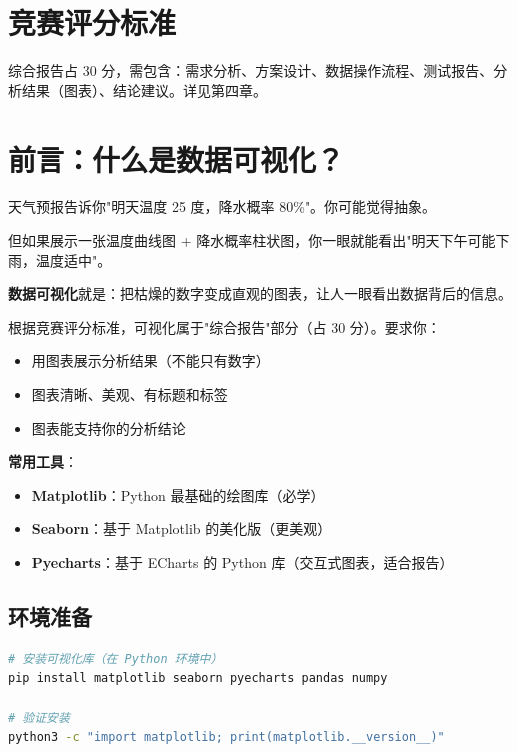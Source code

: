 \documentclass[12pt,a4paper]{article}
\begin{document}
\section*{竞赛评分标准}

综合报告占 30 分，需包含：需求分析、方案设计、数据操作流程、测试报告、分析结果（图表）、结论建议。详见第四章。


\tableofcontents
\newpage

\section{前言：什么是数据可视化？}

\begin{theorybox}[用天气预报理解数据可视化]
天气预报告诉你"明天温度 25 度，降水概率 80\%"。你可能觉得抽象。

但如果展示一张温度曲线图 + 降水概率柱状图，你一眼就能看出"明天下午可能下雨，温度适中"。

\textbf{数据可视化}就是：把枯燥的数字变成直观的图表，让人一眼看出数据背后的信息。
\end{theorybox}

\begin{knowledgebox}[竞赛中的可视化考什么？]
根据竞赛评分标准，可视化属于"综合报告"部分（占 30 分）。要求你：
\begin{itemize}
    \item 用图表展示分析结果（不能只有数字）
    \item 图表清晰、美观、有标题和标签
    \item 图表能支持你的分析结论
\end{itemize}

\textbf{常用工具}：
\begin{itemize}
    \item \textbf{Matplotlib}：Python 最基础的绘图库（必学）
    \item \textbf{Seaborn}：基于 Matplotlib 的美化版（更美观）
    \item \textbf{Pyecharts}：基于 ECharts 的 Python 库（交互式图表，适合报告）
\end{itemize}
\end{knowledgebox}

\subsection{环境准备}

\begin{lstlisting}[language=bash]
# 安装可视化库（在 Python 环境中）
pip install matplotlib seaborn pyecharts pandas numpy

# 验证安装
python3 -c "import matplotlib; print(matplotlib.__version__)"
\end{lstlisting}
\end{document}
